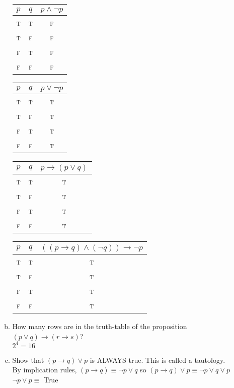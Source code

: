 \documentclass[11pt]{article}
\def\OR{\vee}
\def\AND{\wedge}
\def\imp{\rightarrow}
\begin{document}
\begin{itemize}
\begin{enumerate}[(a)]
\begin{multicols}{4}
    \begin{tabular}{cc|c}
      $p$&$q$&$p \AND \neg p$\\
      \hline
      \textsc{t}&\textsc{t}&\textsc{f}\\
      \textsc{t}&\textsc{f}&\textsc{f}\\
      \textsc{f}&\textsc{t}&\textsc{f}\\
      \textsc{f}&\textsc{f}&\textsc{f}\\
    \end{tabular}
\begin{tabular}{cc|c}
      $p$&$q$&$p \OR \neg p$\\
      \hline
      \textsc{t}&\textsc{t}&\textsc{t}\\
      \textsc{t}&\textsc{f}&\textsc{t}\\
      \textsc{f}&\textsc{t}&\textsc{t}\\
      \textsc{f}&\textsc{f}&\textsc{t}\\
    \end{tabular}
\begin{tabular}{cc|c}
      $p$&$q$&$p \imp (p \OR q)$\\
      \hline
      \textsc{t}&\textsc{t}&\textsc{t}\\
      \textsc{t}&\textsc{f}&\textsc{t}\\
      \textsc{f}&\textsc{t}&\textsc{t}\\
      \textsc{f}&\textsc{f}&\textsc{t}\\
    \end{tabular}
\begin{tabular}{cc|c}
      $p$&$q$&$((p \imp q) \AND (\neg q)) \imp \neg p$\\
      \hline
      \textsc{t}&\textsc{t}&\textsc{t}\\
      \textsc{t}&\textsc{f}&\textsc{t}\\
      \textsc{f}&\textsc{t}&\textsc{t}\\
      \textsc{f}&\textsc{f}&\textsc{t}\\
    \end{tabular}
\end{multicols}

  \item How many rows are in the truth-table of the proposition
    $(p\OR q)\imp(r\imp s)$?
\\$2^4=16$

  \item Show that $(p\imp q)\OR p$ is ALWAYS true.
    This is called a tautology.
\\By implication rules, $(p\imp q)\equiv\neg p \OR q$ so $(p\imp q)\OR p\equiv\neg p \OR q \OR p$
\\$\neg p\OR p\equiv$ True
  \end{enumerate}


\end{itemize}
\end{document}

